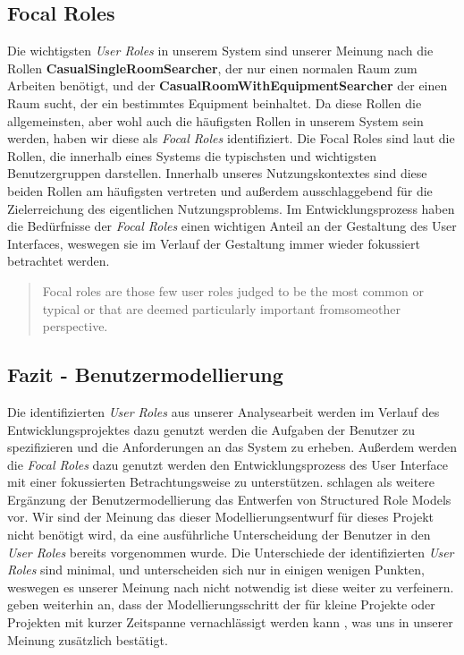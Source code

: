        
\subsection{Focal Roles}
\label{sec:Focal_Roles}

Die wichtigsten \textit{User Roles} in unserem System sind unserer Meinung nach die
Rollen \textbf{CasualSingleRoomSearcher}, der nur einen normalen Raum zum
Arbeiten benötigt, und der \textbf{CasualRoomWithEquipmentSearcher} der einen
Raum sucht, der ein bestimmtes Equipment beinhaltet. Da diese Rollen die
allgemeinsten, aber wohl auch die häufigsten Rollen in unserem System sein
werden, haben wir diese als \textit{Focal Roles} identifiziert.
Die Focal Roles \citep[Kapitel~4]{softwareForUse} sind laut \textit{\citep{softwareForUse}} die
Rollen, die innerhalb eines Systems die typischsten und wichtigsten
Benutzergruppen darstellen. Innerhalb unseres Nutzungskontextes sind diese
beiden Rollen am häufigsten vertreten und außerdem ausschlaggebend für die
Zielerreichung des eigentlichen Nutzungsproblems. Im Entwicklungsprozess haben
die Bedürfnisse der \textit{Focal Roles} einen wichtigen Anteil an der Gestaltung des
User Interfaces, weswegen sie im Verlauf der Gestaltung immer wieder fokussiert
betrachtet werden.

\begin{quote}
	Focal roles are those few user roles judged to be the most common or typical or that 
	are deemed particularly important fromsomeother perspective.\\
	\citep[Seite 83]{softwareForUse}
\end{quote}

\subsection{Fazit - Benutzermodellierung}
\label{sec:Fazit_Benutzermodellierung}

Die identifizierten \textit{User Roles} aus unserer Analysearbeit werden im Verlauf
des Entwicklungsprojektes dazu genutzt werden die Aufgaben der Benutzer zu
spezifizieren und die Anforderungen an das System zu erheben.
Außerdem werden die \textit{Focal Roles} dazu genutzt werden den Entwicklungsprozess
des User Interface mit einer fokussierten Betrachtungsweise zu unterstützen.
\citep{softwareForUse} schlagen als weitere Ergänzung der
Benutzermodellierung das Entwerfen von Structured Role Models \citep[Kapitel~4]{softwareForUse} vor.
Wir sind der Meinung das dieser Modellierungsentwurf für dieses Projekt nicht
benötigt wird, da eine ausführliche Unterscheidung der Benutzer in den
\textit{User Roles} bereits vorgenommen wurde. Die Unterschiede der
identifizierten \textit{User Roles} sind minimal, und unterscheiden sich nur in
einigen wenigen Punkten, weswegen es unserer Meinung nach nicht notwendig ist
diese weiter zu verfeinern. \citep{softwareForUse} geben weiterhin an,
dass der Modellierungsschritt der \citep[Kapitel 4]{softwareForUse} für kleine
Projekte oder Projekten mit kurzer Zeitspanne vernachlässigt werden kann
\citep[Seite 89, 2. Absatz, 3. Zeile]{softwareForUse}, was uns in unserer Meinung zusätzlich bestätigt.



